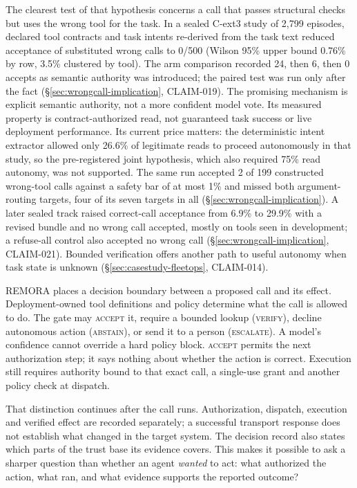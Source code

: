 \documentclass[10pt,twocolumn]{article}
\begin{document}
The clearest test of that hypothesis concerns a call that passes
structural checks but uses the wrong tool for the task. In a sealed
C-ext3 study of 2{,}799 episodes, declared tool contracts and task
intents re-derived from the task text reduced acceptance of substituted
wrong calls to 0/500 (Wilson 95\% upper bound 0.76\% by row, 3.5\%
clustered by tool). The arm comparison recorded 24, then 6, then 0 accepts
as semantic authority was introduced; the paired test was run only after
the fact
(\S\ref{sec:wrongcall-implication}, CLAIM-019). The promising mechanism
is explicit semantic authority, not a more confident model vote. Its
measured property is contract-authorized read, not guaranteed task success
or live deployment performance. Its current price matters: the deterministic intent extractor allowed only
26.6\% of legitimate reads to proceed autonomously in that study, so the
pre-registered joint hypothesis, which also required 75\% read autonomy,
was not supported. The same run accepted 2 of 199 constructed wrong-tool
calls against a safety bar of at most 1\% and missed both argument-routing
targets, four of its seven targets in all
(\S\ref{sec:wrongcall-implication}). A later
sealed track raised correct-call acceptance from 6.9\% to 29.9\% with a
revised bundle and no wrong call accepted, mostly on tools seen in
development; a refuse-all control also accepted no wrong call
(\S\ref{sec:wrongcall-implication}, CLAIM-021).
Bounded verification offers another path to useful autonomy when task
state is unknown (\S\ref{sec:casestudy-fleetops}, CLAIM-014).

REMORA places a decision boundary between a proposed call and its
effect. Deployment-owned tool definitions and policy determine what the
call is allowed to do. The gate may \textsc{accept} it, require a bounded
lookup (\textsc{verify}), decline autonomous action (\textsc{abstain}),
or send it to a person (\textsc{escalate}). A model's confidence cannot
override a hard policy block. \textsc{accept} permits the next
authorization step; it says nothing about whether the action is correct.
Execution still requires authority bound to that exact call, a
single-use grant and another policy check at dispatch.

That distinction continues after the call runs. Authorization,
dispatch, execution and verified effect are recorded separately; a
successful transport response does not establish what changed in the
target system. The decision record also states which parts of the trust
base its evidence covers. This makes it possible to ask a sharper
question than whether an agent \emph{wanted} to act: what authorized the
action, what ran, and what evidence supports the reported outcome?
\end{document}
